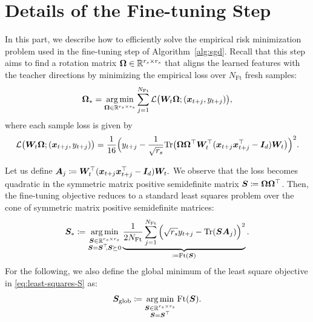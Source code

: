 \section{Details of the Fine-tuning Step}
\label{sec:finetuning}

In this part, we describe how to efficiently solve the empirical risk minimization problem used in the fine-tuning step of Algorithm~\ref{alg:sgd}. Recall that this step aims to find a rotation matrix $\boldsymbol{\Omega} \in \mathbb{R}^{r_s \times r_s}$ that aligns the learned features with the teacher directions by minimizing the empirical loss over $N_{\mathrm{Ft}}$ fresh samples:
\begin{equation}
\boldsymbol{\Omega}_* = \operatorname*{arg\,min}_{\boldsymbol{\Omega} \in \mathbb{R}^{r_s \times r_s}} \sum_{j = 1}^{N_{\mathrm{Ft}}} \mathcal{L}\big(\boldsymbol{W}_t \boldsymbol{\Omega}; (\boldsymbol{x}_{t+j}, y_{t+j}) \big), \label{eq:finetuningobj}
\end{equation}
where each sample loss is given by
\begin{equation}
\mathcal{L}\big(\boldsymbol{W}_t \boldsymbol{\Omega}; (\boldsymbol{x}_{t+j}, y_{t+j}) \big) = \frac{1}{16} \Big( y_{t+j} - \frac{1}{\sqrt{r_s}} \text{Tr}\big(\boldsymbol{\Omega} \boldsymbol{\Omega}^\top \boldsymbol{W}_t^\top (\boldsymbol{x}_{t+j} \boldsymbol{x}_{t+j}^\top - \boldsymbol{I}_d) \boldsymbol{W}_t \big) \Big)^2.
\end{equation}

Let us define  
$\boldsymbol{A}_j \coloneqq \boldsymbol{W}_t^\top (\boldsymbol{x}_{t+j} \boldsymbol{x}_{t+j}^\top - \boldsymbol{I}_d) \boldsymbol{W}_t.$
We observe that the loss becomes quadratic in the symmetric matrix positive semidefinite matrix $\boldsymbol{S} \coloneqq \boldsymbol{\Omega} \boldsymbol{\Omega}^\top$. Then, the fine-tuning objective reduces to a standard least squares problem over the cone of symmetric matrix positive semidefinite matrices:
\begin{equation}
\boldsymbol{S}_* \coloneqq  \operatorname*{arg\,min}_{\substack{\boldsymbol{S} \in \mathbb{R}^{r_s \times r_s} \\ \boldsymbol{S} = \boldsymbol{S}^\top \!\!,  \boldsymbol{S} \succeq 0}} \underbrace{ \frac{1}{2 N_{\mathrm{Ft}}} \sum_{j = 1}^{N_{\mathrm{Ft}}} \Big( \sqrt{r_s}y_{t+j} - \text{Tr}(\boldsymbol{S} \boldsymbol{A}_j) \Big)^2 }_{\coloneqq \mathrm{Ft}(\boldsymbol{S})}. \label{eq:least-squares-S}
\end{equation}
For the following, we also define the global minimum of  the least square objective in \eqref{eq:least-squares-S} as:
\begin{equation}
\boldsymbol{S}_{\mathrm{glob}} \coloneqq \operatorname*{arg\,min}_{\substack{\boldsymbol{S} \in \mathbb{R}^{r_s \times r_s} \\ \boldsymbol{S} = \boldsymbol{S}^\top}} \mathrm{Ft}(\boldsymbol{S}). \label{eq:least-squares-Sglob}
\end{equation}

